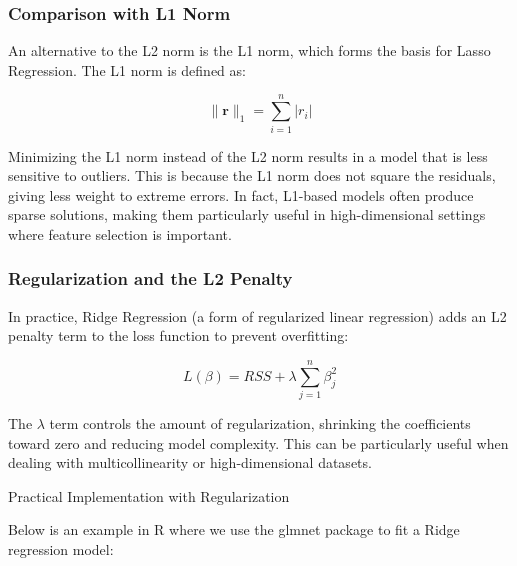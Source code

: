 \documentclass[
  12 pt,
  a4paper,
]{book}
\numberwithin{equation}{section}
\theoremstyle{plain}      %
\theoremstyle{definition} %
\theoremstyle{remark}     %
\theoremstyle{note}         %
\begin{document}
\hypertarget{comparison-with-l1-norm}{%
\subsubsection{Comparison with L1 Norm}\label{comparison-with-l1-norm}}

An alternative to the L2 norm is the L1 norm, which forms the basis for
Lasso Regression. The L1 norm is defined as:

\[
\|\mathbf{r}\|_1=\sum_{i=1}^n\left|r_i\right|
\]

Minimizing the L1 norm instead of the L2 norm results in a model that is
less sensitive to outliers. This is because the L1 norm does not square
the residuals, giving less weight to extreme errors. In fact, L1-based
models often produce sparse solutions, making them particularly useful
in high-dimensional settings where feature selection is important.

\hypertarget{regularization-and-the-l2-penalty}{%
\subsubsection{Regularization and the L2
Penalty}\label{regularization-and-the-l2-penalty}}

In practice, Ridge Regression (a form of regularized linear regression)
adds an L2 penalty term to the loss function to prevent overfitting:

\[
L(\beta)=R S S+\lambda \sum_{j=1}^n \beta_j^2
\]

The \(\lambda\) term controls the amount of regularization, shrinking
the coefficients toward zero and reducing model complexity. This can be
particularly useful when dealing with multicollinearity or
high-dimensional datasets.

Practical Implementation with Regularization

Below is an example in R where we use the glmnet package to fit a Ridge
regression model:

\scriptsize
\end{document}
